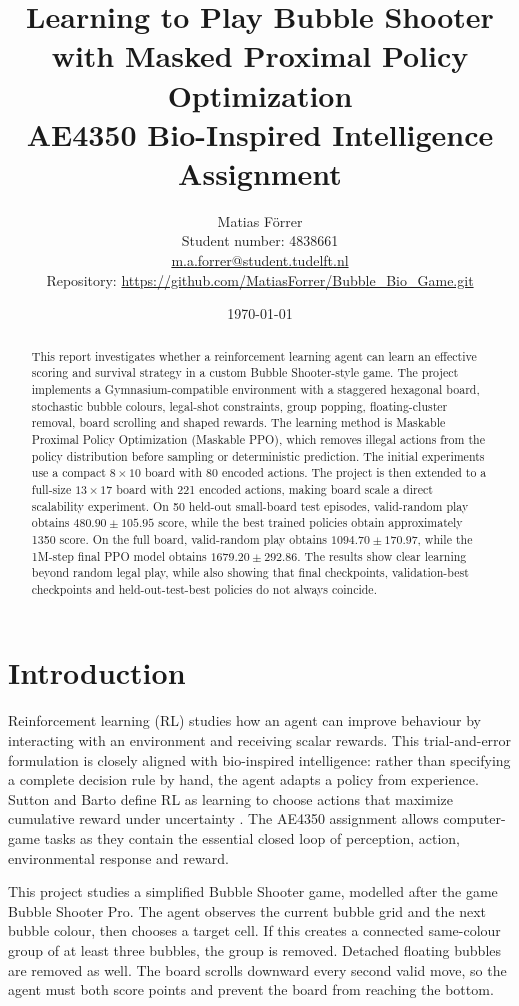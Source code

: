 \documentclass[10pt,a4paper]{article}
\title{\textbf{Learning to Play Bubble Shooter with Masked Proximal Policy Optimization}\\
\large AE4350 Bio-Inspired Intelligence Assignment}
\author{Matias F{\"o}rrer\\
Student number: 4838661\\
\href{mailto:m.a.forrer@student.tudelft.nl}{m.a.forrer@student.tudelft.nl}\\
Repository: \url{https://github.com/MatiasForrer/Bubble_Bio_Game.git}}
\date{\today}
\begin{document}
\maketitle

\begin{abstract}
This report investigates whether a reinforcement learning agent can learn an effective scoring and survival strategy in a custom Bubble Shooter-style game. The project implements a Gymnasium-compatible environment with a staggered hexagonal board, stochastic bubble colours, legal-shot constraints, group popping, floating-cluster removal, board scrolling and shaped rewards. The learning method is Maskable Proximal Policy Optimization (Maskable PPO), which removes illegal actions from the policy distribution before sampling or deterministic prediction. The initial experiments use a compact \(8\times10\) board with 80 encoded actions. The project is then extended to a full-size \(13\times17\) board with 221 encoded actions, making board scale a direct scalability experiment. On 50 held-out small-board test episodes, valid-random play obtains \(480.90 \pm 105.95\) score, while the best trained policies obtain approximately 1350 score. On the full board, valid-random play obtains \(1094.70 \pm 170.97\), while the 1M-step final PPO model obtains \(1679.20 \pm 292.86\). The results show clear learning beyond random legal play, while also showing that final checkpoints, validation-best checkpoints and held-out-test-best policies do not always coincide.
\end{abstract}

\section{Introduction}

Reinforcement learning (RL) studies how an agent can improve behaviour by interacting with an environment and receiving scalar rewards. This trial-and-error formulation is closely aligned with bio-inspired intelligence: rather than specifying a complete decision rule by hand, the agent adapts a policy from experience. Sutton and Barto define RL as learning to choose actions that maximize cumulative reward under uncertainty \cite{SuttonBarto2018}. The AE4350 assignment allows computer-game tasks as they contain the essential closed loop of perception, action, environmental response and reward.

This project studies a simplified Bubble Shooter game, modelled after the game Bubble Shooter Pro. The agent observes the current bubble grid and the next bubble colour, then chooses a target cell. If this creates a connected same-colour group of at least three bubbles, the group is removed. Detached floating bubbles are removed as well. The board scrolls downward every second valid move, so the agent must both score points and prevent the board from reaching the bottom.
\end{document}
